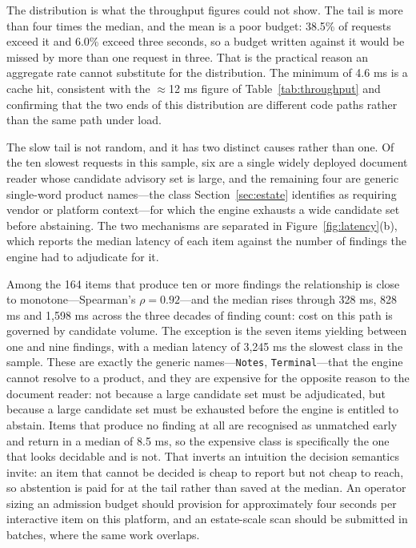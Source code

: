 \documentclass[fleqn,10pt,lineno]{wlpeerj}
\begin{document}
The distribution is what the throughput figures could not show. The tail is more than four times the median, and the mean is a poor budget: 38.5\% of requests exceed it and 6.0\% exceed three seconds, so a budget written against it would be missed by more than one request in three. That is the practical reason an aggregate rate cannot substitute for the distribution. The minimum of 4.6 ms is a cache hit, consistent with the $\approx$12 ms figure of Table~\ref{tab:throughput} and confirming that the two ends of this distribution are different code paths rather than the same path under load.

The slow tail is not random, and it has two distinct causes rather than one. Of the ten slowest requests in this sample, six are a single widely deployed document reader whose candidate advisory set is large, and the remaining four are generic single-word product names---the class Section~\ref{sec:estate} identifies as requiring vendor or platform context---for which the engine exhausts a wide candidate set before abstaining. The two mechanisms are separated in Figure~\ref{fig:latency}(b), which reports the median latency of each item against the number of findings the engine had to adjudicate for it.

Among the 164 items that produce ten or more findings the relationship is close to monotone---Spearman's $\rho = 0.92$---and the median rises through 328 ms, 828 ms and 1,598 ms across the three decades of finding count: cost on this path is governed by candidate volume. The exception is the seven items yielding between one and nine findings, with a median latency of 3,245 ms the slowest class in the sample. These are exactly the generic names---\texttt{Notes}, \texttt{Terminal}---that the engine cannot resolve to a product, and they are expensive for the opposite reason to the document reader: not because a large candidate set must be adjudicated, but because a large candidate set must be exhausted before the engine is entitled to abstain. Items that produce no finding at all are recognised as unmatched early and return in a median of 8.5 ms, so the expensive class is specifically the one that looks decidable and is not. That inverts an intuition the decision semantics invite: an item that cannot be decided is cheap to report but not cheap to reach, so abstention is paid for at the tail rather than saved at the median. An operator sizing an admission budget should provision for approximately four seconds per interactive item on this platform, and an estate-scale scan should be submitted in batches, where the same work overlaps.
\end{document}
